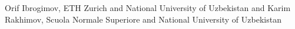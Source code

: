 Orif Ibrogimov, ETH Zurich and National University of Uzbekistan and Karim Rakhimov, Scuola Normale Superiore and National University of Uzbekistan